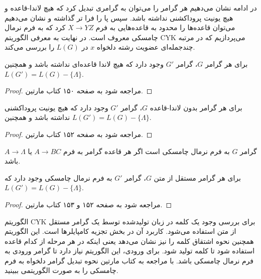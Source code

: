\documentclass[main.tex]{subfiles}
\begin{document}
	 در ادامه نشان می‌دهیم هر گرامر را می‌توان به گرامری تبدیل کرد که هیچ لاندا-قاعده و هیچ یونیت پروداکشنی نداشته باشد. سپس پا را فرا تر گذاشته و نشان می‌دهیم می‌توان قاعده‌ها را محدود به قاعده‌هایی به فرم 
	 $X \rightarrow YZ$
	 کرد که به فرم نرمال چامسکی
	  معروف است. در نهایت به معرفی الگوریتم CYK 
	 می‌پردازیم که در مرتبه چندجمله‌ای
	  عضویت رشته دلخواه
	 $x$
	 در 
	 $L(G)$
	 را بررسی می‌کند.
	 \begin{theorem}
	 	برای هر گرامر $G$، گرامر $G'$ وجود دارد که هیچ لاندا قاعده‌ای نداشته باشد و همچنین
	 	$L(G') = L(G) - \{\Lambda\}$.
	 \end{theorem}
 	\begin{proof}
 		مراجعه شود به صفحه ۱۵۰ کتاب مارتین.
 	\end{proof}
	  \begin{theorem}
	 	برای هر گرامر بدون لاندا-قاعده $G$، گرامر $G'$ وجود دارد که هیچ یونیت پروداکشنی نداشته باشد و همچنین
	 	$L(G') = L(G) - \{\Lambda\}$.
	 \end{theorem}
	 \begin{proof}
	 	مراجعه شود به صفحه ۱۵۲ کتاب مارتین.
	 \end{proof}
 \begin{definition}
 	گرامر $G$ به فرم نرمال چامسکی است اگر هر قاعده گرامر به فرم 
 	$A \rightarrow BC$
 	یا 
 	 $A \rightarrow \Lambda$
 	 باشد.
 \end{definition}
	  \begin{theorem}
	برای هر گرامر مستقل از متن $G$، گرامر $G'$ به فرم نرمال چامسکی وجود دارد که 
	$L(G') = L(G) - \{\Lambda\}$.
\end{theorem}
	\begin{proof}
	مراجعه شود به صفحه ۱۵۲ و ۱۵۳ کتاب مارتین.
\end{proof}
	الگوریتم 
	CYK
	برای بررسی وجود یک کلمه در زبان تولیدشده توسط یک گرامر مستقل از متن استفاده می‌شود. کاربرد آن در بخش تجزیه 
	کامپایلرها است. این الگوریتم همچنین نحوه اشتقاق کلمه را نیز نشان می‌دهد یعنی اینکه در هر مرحله از کدام قاعده استفاده شود تا کلمه تولید شود. برای ورودی، این الگوریتم نیاز دارد تا گرامر ورودی به فرم نرمال چامسکی باشد. با مراجعه به کتاب مارتین نحوه تبدیل گرامر دلخواه به فرم چامسکی را به صورت الگوریتمی ببینید. 
	
	
\end{document}
